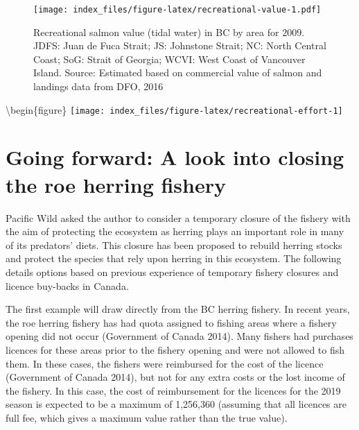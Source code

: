 \documentclass[]{article}
\theoremstyle{definition}
\theoremstyle{definition}
\theoremstyle{definition}
\theoremstyle{remark}
\begin{document}
\begin{figure}
\centering
\texttt{[image: index\_files/figure-latex/recreational-value-1.pdf]}
\caption{\label{fig:recreational-value}Recreational salmon value (tidal
water) in BC by area for 2009. JDFS: Juan de Fuca Strait; JS: Johnstone
Strait; NC: North Central Coast; SoG: Strait of Georgia; WCVI: West
Coast of Vancouver Island. Source: Estimated based on commercial value
of salmon and landings data from DFO, 2016}
\end{figure}

\textbackslash{}begin\{figure\}
\texttt{[image: index\_files/figure-latex/recreational-effort-1]}

\section{Going forward: A look into closing the roe herring
fishery}\label{going-forward-a-look-into-closing-the-roe-herring-fishery}

Pacific Wild asked the author to consider a temporary closure of the
fishery with the aim of protecting the ecosystem as herring plays an
important role in many of its predators' diets. This closure has been
proposed to rebuild herring stocks and protect the species that rely
upon herring in this ecosystem. The following details options based on
previous experience of temporary fishery closures and licence buy-backs
in Canada.

The first example will draw directly from the BC herring fishery. In
recent years, the roe herring fishery has had quota assigned to fishing
areas where a fishery opening did not occur (Government of Canada 2014).
Many fishers had purchases licences for these areas prior to the fishery
opening and were not allowed to fish them. In these cases, the fishers
were reimbursed for the cost of the licence (Government of Canada 2014),
but not for any extra costs or the lost income of the fishery. In this
case, the cost of reimbursement for the licences for the 2019 season is
expected to be a maximum of 1,256,360 (assuming that all licences are
full fee, which gives a maximum value rather than the true value).
\end{document}
